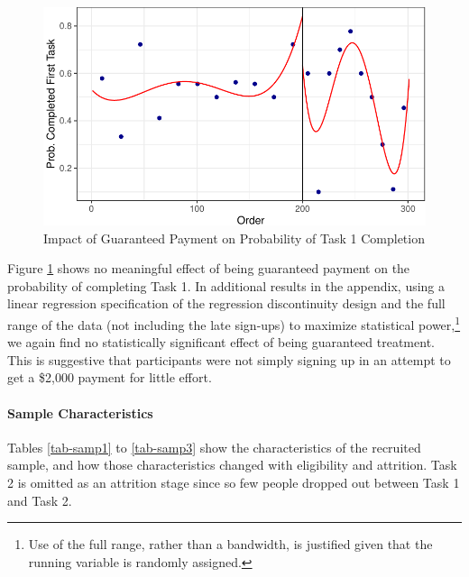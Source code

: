 \documentclass[
  letterpaper,
  DIV=11,
  numbers=noendperiod]{scrartcl}
\let\oldparagraph\paragraph
\renewcommand{\paragraph}[1]{\oldparagraph{#1}\mbox{}}
\begin{document}
\begin{figure}

{\centering \includegraphics{The-Sources-of-Researcher-Variation-in-Economics_files/figure-pdf/fig-rdd-1.pdf}

}

\caption{\label{fig-rdd}Impact of Guaranteed Payment on Probability of
Task 1 Completion}

\end{figure}

Figure \ref{fig-rdd} shows no meaningful effect of being guaranteed
payment on the probability of completing Task 1. In additional results
in the appendix, using a linear regression specification of the
regression discontinuity design and the full range of the data (not
including the late sign-ups) to maximize statistical power,\footnote{Use
  of the full range, rather than a bandwidth, is justified given that
  the running variable is randomly assigned.} we again find no
statistically significant effect of being guaranteed treatment. This is
suggestive that participants were not simply signing up in an attempt to
get a \$2,000 payment for little effort.

\hypertarget{sample-characteristics}{%
\paragraph{Sample Characteristics}\label{sample-characteristics}}

Tables \ref{tab-samp1} to \ref{tab-samp3} show the characteristics of
the recruited sample, and how those characteristics changed with
eligibility and attrition. Task 2 is omitted as an attrition stage since
so few people dropped out between Task 1 and Task 2.
\end{document}
